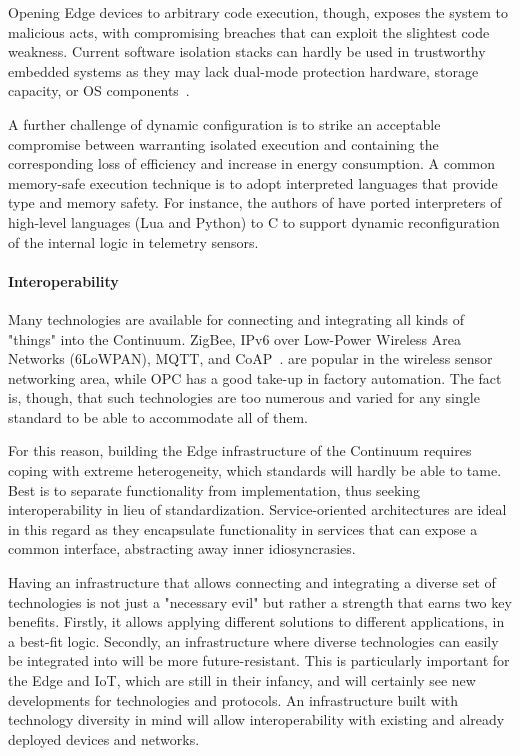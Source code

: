 Opening Edge devices to arbitrary code execution, though, exposes the system to malicious acts, with compromising breaches that can exploit the slightest code weakness.
Current software isolation stacks can hardly be used in trustworthy embedded systems as they may lack dual-mode protection hardware, storage capacity, or OS components~\cite{peach2020ewasm}. 

A further challenge of dynamic configuration is to strike an acceptable compromise between warranting isolated execution and containing the corresponding loss of efficiency and increase in energy consumption. 
A common memory-safe execution technique is to adopt interpreted languages that provide type and memory safety. 
For instance, the authors of \cite{brzoza2016embedded} have ported interpreters of high-level languages (Lua and Python) to C to support dynamic reconfiguration of the internal logic in telemetry sensors.

\paragraph{Interoperability}
\label{sec:interoperability}

Many technologies are available for connecting and integrating all kinds of "things" into the Continuum. 
ZigBee, IPv6 over Low-Power Wireless Area Networks (6LoWPAN), MQTT, and CoAP~\cite{naik2017choice}. are popular in the wireless sensor networking area, while OPC \cite{gruner2016restful} has a good take-up in factory automation. 
The fact is, though, that such technologies are too numerous and varied for any single standard to be able to accommodate all of them.

For this reason, building the Edge infrastructure of the Continuum requires coping with extreme heterogeneity, which standards will hardly be able to tame.
Best is to separate functionality from implementation, thus seeking interoperability in lieu of standardization. Service-oriented architectures are ideal in this regard as they encapsulate functionality in services that can expose a common interface, abstracting away inner idiosyncrasies.

Having an infrastructure that allows connecting and integrating a diverse set of technologies is not just a "necessary evil" but rather a strength that earns two key benefits. Firstly, it allows applying different solutions to different applications, in a best-fit logic. 
Secondly, an infrastructure where diverse technologies can easily be integrated into will be more future-resistant. 
This is particularly important for the Edge and IoT, which are still in their infancy, and will certainly see new developments for technologies and protocols. An infrastructure built with technology diversity in mind will allow interoperability with existing and already deployed devices and networks.

